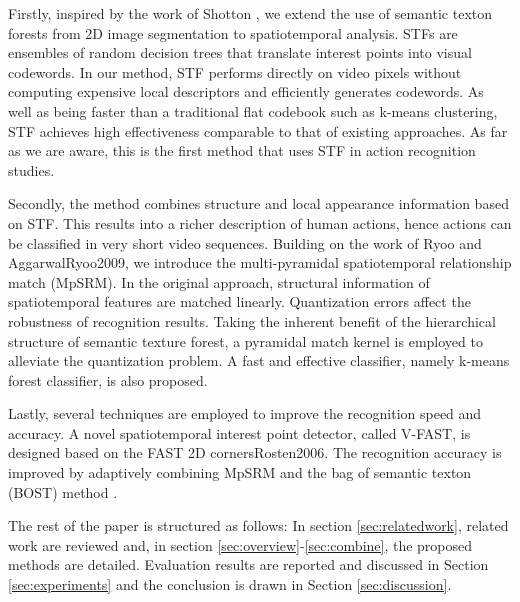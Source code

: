 Firstly, inspired by the work of Shotton , we extend the use of semantic texton forests from 2D image segmentation to spatiotemporal analysis. STFs are ensembles of random decision trees that translate interest points into visual codewords. In our method, STF performs directly on video pixels without computing expensive local descriptors and efficiently generates codewords. As well as being faster than a traditional flat codebook such as k-means clustering, STF achieves high effectiveness comparable to that of existing approaches.
As far as we are aware, this is the first method that uses STF in action recognition studies.

Secondly, the method combines structure and local appearance information based on STF. This results into a richer description of human actions, hence actions can be classified in very short video sequences. Building on the work of Ryoo and Aggarwal{Ryoo2009}, we introduce the multi-pyramidal spatiotemporal relationship match (MpSRM). In the original approach, structural information of spatiotemporal features are matched linearly. Quantization errors affect the robustness of recognition results. Taking the inherent benefit of the hierarchical structure of semantic texture forest, a pyramidal match kernel \cite{Grauman2005} is employed to alleviate the quantization problem.
A fast and effective classifier, namely k-means forest classifier, is also proposed.

Lastly, several techniques are employed to improve the recognition speed and accuracy. A novel spatiotemporal interest point detector, called V-FAST, is designed based on the FAST 2D corners{Rosten2006}. The recognition accuracy is improved by adaptively combining MpSRM and the bag of semantic texton (BOST) method \cite{Shotton2008}.

The rest of the paper is structured as follows: In section \ref{sec:relatedwork}, related work are reviewed and, in section \ref{sec:overview}-\ref{sec:combine}, the proposed methods are detailed. Evaluation results are reported and discussed in Section \ref{sec:experiments} and the conclusion is drawn in Section \ref{sec:discussion}.



